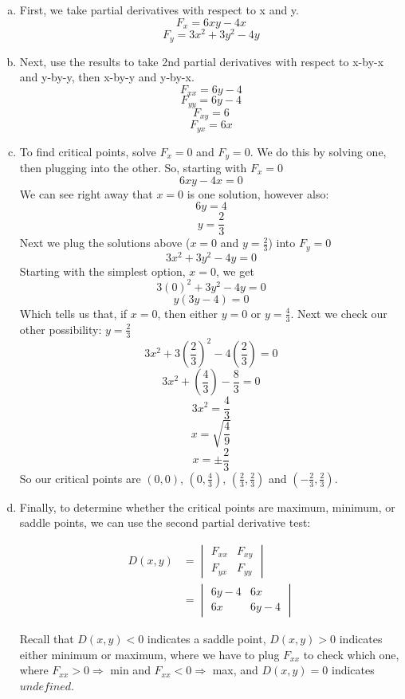 \documentclass{article}
\begin{document}
\begin{enumerate}[a.]
    \item First, we take partial derivatives with respect to x and y.
    \[F_x=6xy-4x\]
    \[F_y=3x^{2}+3y^{2}-4y\]
    \item Next, use the results to take 2nd partial derivatives with respect to x-by-x and y-by-y, then x-by-y and y-by-x.
    \[F_{xx}=6y-4\]
    \[F_{yy}=6y-4\]
    \[F_{xy}=6\]
    \[F_{yx}=6x\]
    \item To find critical points, solve $F_x=0$ and $F_y=0$. We do this by solving one, then plugging into the other. So, starting with $F_x=0$
    \[6xy-4x=0\]
    We can see right away that $x=0$ is one solution, however also:
	\[6y=4\]
	\[y=\frac{2}{3}\]
	Next we plug the solutions above ($x=0$ and $y=\frac{2}{3}$) into $F_y=0$
	\[3x^{2}+3y^{2}-4y=0\]
	Starting with the simplest option, $x=0$, we get
	\[3(0)^{2}+3y^{2}-4y=0\]
	\[y(3y-4)=0\]
	Which tells us that, if $x=0$, then either $y=0$ or $y=\frac{4}{3}$. Next we check our other possibility: $y=\frac{2}{3}$
	\[3x^{2}+3\left(\frac{2}{3}\right)^{2}-4\left(\frac{2}{3}\right)=0\]
	\[3x^2+(\frac{4}{3})-\frac{8}{3}=0\]
	\[3x^2=\frac{4}{3}\]
	\[x=\sqrt{\frac{4}{9}}\]
	\[x=\pm\frac{2}{3}\]
	So our critical points are $(0,0)$, $\left(0,\frac{4}{3}\right)$, $\left(\frac{2}{3},\frac{2}{3}\right)$ and $\left(-\frac{2}{3},\frac{2}{3}\right)$.
	
	\item Finally, to determine whether the critical points are maximum, minimum, or saddle points, we can use the second partial derivative test:
	
	\begin{equation}
	    \begin{split}
	        D(x,y)&= \begin{vmatrix} F_{xx} & F_{xy} \\ F_{yx} & F_{yy} \end{vmatrix}\\
	        &=\begin{vmatrix}6y-4&6x\\6x&6y-4\end{vmatrix}
	    \end{split}
	\end{equation}
	
	Recall that $D(x,y)<0$ indicates a saddle point, $D(x,y)>0$ indicates either minimum or maximum, where we have to plug $F_{xx}$ to check which one, where $F_{xx}>0 \Rightarrow$ min and $F_{xx}<0\Rightarrow$ max, and  $D(x,y)=0$ indicates $undefined$.
	

\end{enumerate}
\end{document}
